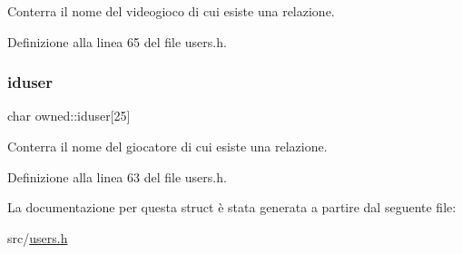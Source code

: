 Conterra\textquotesingle{} il nome del videogioco di cui esiste una relazione. 



Definizione alla linea 65 del file users.\+h.

\mbox{\label{structowned_a773d204967beb2a8a56603382086f1e1}} 
\subsubsection{\texorpdfstring{iduser}{iduser}}
{\footnotesize\ttfamily char owned\+::iduser\mbox{[}25\mbox{]}}



Conterra\textquotesingle{} il nome del giocatore di cui esiste una relazione. 



Definizione alla linea 63 del file users.\+h.



La documentazione per questa struct è stata generata a partire dal seguente file\+:\begin{DoxyCompactItemize}
\item 
src/\hyperlink{users_8h}{users.\+h}\end{DoxyCompactItemize}
